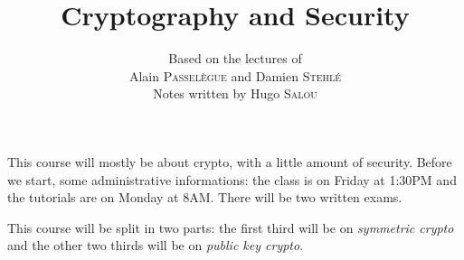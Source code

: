 \documentclass{../notes-en}
\title{Cryptography and Security}
\author{Based on the lectures of\\ Alain \textsc{Passelègue} and Damien \textsc{Stehlé} \\ Notes written by Hugo \textsc{Salou}}
\begin{document}
  \maketitle

  \dominitoc
  \tableofcontents

  \pagebreak

  This course will mostly be about crypto, with a little amount of security.
  Before we start, some administrative informations: the class is on Friday at 1:30PM and the tutorials are on Monday at 8AM.
  There will be two written exams.

  This course will be split in two parts: the first third will be on \textit{symmetric crypto} and the other two thirds will be on \textit{public key crypto}.

  
  
\end{document}
